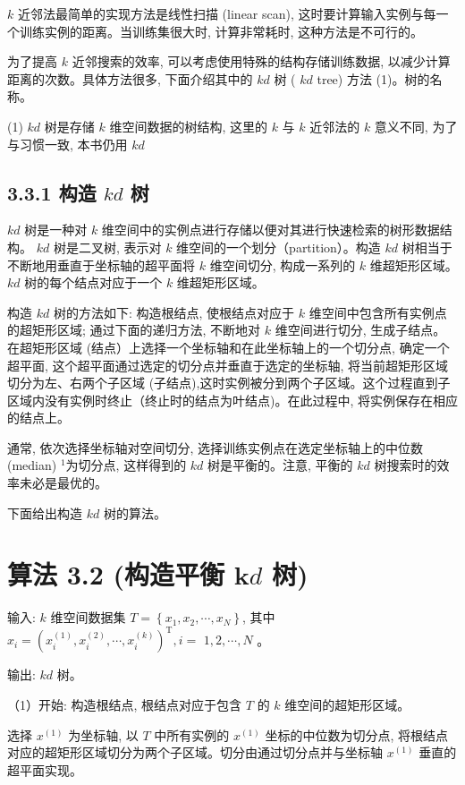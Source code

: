 \documentclass[10pt]{article}
\begin{document}
$k$ 近邻法最简单的实现方法是线性扫描 (linear scan), 这时要计算输入实例与每一个训练实例的距离。当训练集很大时, 计算非常耗时, 这种方法是不可行的。

为了提高 $k$ 近邻搜索的效率, 可以考虑使用特殊的结构存储训练数据, 以减少计算距离的次数。具体方法很多, 下面介绍其中的 $k d$ 树 ( $k d$ tree) 方法 (1)。树的名称。

(1) $k d$ 树是存储 $k$ 维空间数据的树结构, 这里的 $k$ 与 $k$ 近邻法的 $k$ 意义不同, 为了与习惯一致, 本书仍用 $k d$

\subsection*{3.3.1 构造 $k d$ 树}
$k d$ 树是一种对 $k$ 维空间中的实例点进行存储以便对其进行快速检索的树形数据结构。 $k d$ 树是二叉树, 表示对 $k$ 维空间的一个划分（partition）。构造 $k d$ 树相当于不断地用垂直于坐标轴的超平面将 $k$ 维空间切分, 构成一系列的 $k$ 维超矩形区域。 $k d$ 树的每个结点对应于一个 $k$ 维超矩形区域。

构造 $k d$ 树的方法如下: 构造根结点, 使根结点对应于 $k$ 维空间中包含所有实例点的超矩形区域; 通过下面的递归方法, 不断地对 $k$ 维空间进行切分, 生成子结点。在超矩形区域 (结点）上选择一个坐标轴和在此坐标轴上的一个切分点, 确定一个超平面, 这个超平面通过选定的切分点并垂直于选定的坐标轴, 将当前超矩形区域切分为左、右两个子区域 (子结点),这时实例被分到两个子区域。这个过程直到子区域内没有实例时终止（终止时的结点为叶结点)。在此过程中, 将实例保存在相应的结点上。

通常, 依次选择坐标轴对空间切分, 选择训练实例点在选定坐标轴上的中位数 (median) ${ }^{1}$为切分点, 这样得到的 $k d$ 树是平衡的。注意, 平衡的 $k d$ 树搜索时的效率未必是最优的。

下面给出构造 $k d$ 树的算法。

\section*{算法 3.2 (构造平衡 $\boldsymbol{k} d$ 树)}
输入: $k$ 维空间数据集 $T=\left\{x_{1}, x_{2}, \cdots, x_{N}\right\}$, 其中 $x_{i}=\left(x_{i}^{(1)}, x_{i}^{(2)}, \cdots, x_{i}^{(k)}\right)^{\mathrm{T}}, i=$ $1,2, \cdots, N$ 。

输出: $k d$ 树。

（1）开始: 构造根结点, 根结点对应于包含 $T$ 的 $k$ 维空间的超矩形区域。

选择 $x^{(1)}$ 为坐标轴, 以 $T$ 中所有实例的 $x^{(1)}$ 坐标的中位数为切分点, 将根结点对应的超矩形区域切分为两个子区域。切分由通过切分点并与坐标轴 $x^{(1)}$ 垂直的超平面实现。
\end{document}
